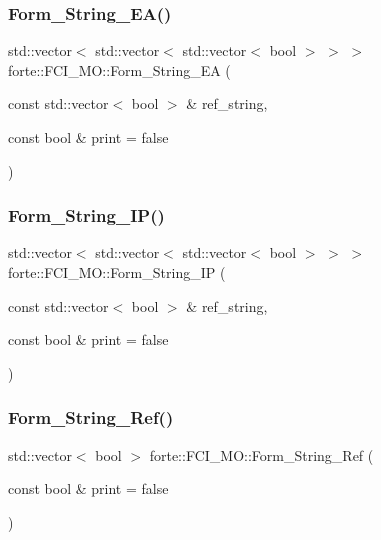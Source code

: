 \subsubsection{\texorpdfstring{Form\+\_\+\+String\+\_\+\+E\+A()}{Form\_String\_EA()}}
{\footnotesize\ttfamily std\+::vector$<$ std\+::vector$<$ std\+::vector$<$ bool $>$ $>$ $>$ forte\+::\+F\+C\+I\+\_\+\+M\+O\+::\+Form\+\_\+\+String\+\_\+\+EA (\begin{DoxyParamCaption}\item[{const std\+::vector$<$ bool $>$ \&}]{ref\+\_\+string,  }\item[{const bool \&}]{print = {\ttfamily false} }\end{DoxyParamCaption})\hspace{0.3cm}{\ttfamily [protected]}}

\mbox{\label{classforte_1_1_f_c_i___m_o_a477f4d38d6423f1ffa0672081d00e5b1}} 
\subsubsection{\texorpdfstring{Form\+\_\+\+String\+\_\+\+I\+P()}{Form\_String\_IP()}}
{\footnotesize\ttfamily std\+::vector$<$ std\+::vector$<$ std\+::vector$<$ bool $>$ $>$ $>$ forte\+::\+F\+C\+I\+\_\+\+M\+O\+::\+Form\+\_\+\+String\+\_\+\+IP (\begin{DoxyParamCaption}\item[{const std\+::vector$<$ bool $>$ \&}]{ref\+\_\+string,  }\item[{const bool \&}]{print = {\ttfamily false} }\end{DoxyParamCaption})\hspace{0.3cm}{\ttfamily [protected]}}

\mbox{\label{classforte_1_1_f_c_i___m_o_add69e1a28a6ed06b933980aa9e3e9c62}} 
\subsubsection{\texorpdfstring{Form\+\_\+\+String\+\_\+\+Ref()}{Form\_String\_Ref()}}
{\footnotesize\ttfamily std\+::vector$<$ bool $>$ forte\+::\+F\+C\+I\+\_\+\+M\+O\+::\+Form\+\_\+\+String\+\_\+\+Ref (\begin{DoxyParamCaption}\item[{const bool \&}]{print = {\ttfamily false} }\end{DoxyParamCaption})\hspace{0.3cm}{\ttfamily [protected]}}

